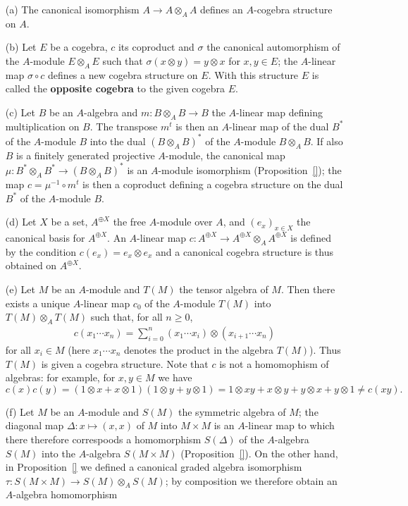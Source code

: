 \begin{example}
\mbox{}
\begin{itemize}
\item[(a)] The canonical isomorphism $A\to A\otimes_AA$ defines an $A$-cogebra structure on $A$.
\item[(b)] Let $E$ be a cogebra, $c$ its coproduct and $\sigma$ the canonical automorphism of the $A$-module $E\otimes_AE$ such that $\sigma(x\otimes y)=y\otimes x$ for $x,y\in E$; the $A$-linear map $\sigma\circ c$ defines a new cogebra structure on $E$. With this structure $E$ is called the \textbf{opposite cogebra} to the given cogebra $E$.
\item[(c)] Let $B$ be an $A$-algebra and $m:B\otimes_AB\to B$ the $A$-linear map defining multiplication on $B$. The transpose $m^t$ is then an $A$-linear map of the dual $B^*$ of the $A$-module $B$ into the dual $(B\otimes_AB)^*$ of the $A$-module $B\otimes_AB$. If also $B$ is a finitely generated projective $A$-module, the canonical map $\mu:B^*\otimes_AB^*\to(B\otimes_AB)^*$ is an $A$-module isomorphism (Proposition~\ref{}); the map $c=\mu^{-1}\circ m^t$ is then a coproduct defining a cogebra structure on the dual $B^*$ of the $A$-module $B$.
\item[(d)] Let $X$ be a set, $A^{\oplus X}$ the free $A$-module over $A$, and $(e_x)_{x\in X}$ the canonical basis for $A^{\oplus X}$. An $A$-linear map $c:A^{\oplus X}\to A^{\oplus X}\otimes_A A^{\oplus X}$ is defined by the condition $c(e_x)=e_x\otimes e_x$ and a canonical cogebra structure is thus obtained on $A^{\oplus X}$.
\item[(e)] Let $M$ be an $A$-module and $T(M)$ the tensor algebra of $M$. Then there exists a unique $A$-linear map $c_0$ of the $A$-module $T(M)$ into $T(M)\otimes_AT(M)$ such that, for all $n\geq 0$,
\begin{align}\label{tensor algebra weak coproduct}
c(x_1\cdots x_n)=\sum_{i=0}^{n}(x_1\cdots x_i)\otimes(x_{i+1}\cdots x_n)
\end{align}
for all $x_i\in M$ (here $x_1\cdots x_n$ denotes the product in the algebra $T(M)$). Thus $T(M)$ is given a cogebra structure. Note that $c$ is not a homomophism of algebras: for example, for $x,y\in M$ we have
\[c(x)c(y)=(1\otimes x+x\otimes 1)(1\otimes y+y\otimes 1)=1\otimes xy+x\otimes y+y\otimes x+y\otimes 1\neq c(xy).\]
\item[(f)] Let $M$ be an $A$-module and $S(M)$ the symmetric algebra of $M$; the diagonal map $\Delta:x\mapsto(x,x)$ of $M$ into $M\times M$ is an $A$-linear map to which there therefore correspoods a homomorphism $S(\Delta)$ of the $A$-algebra $S(M)$ into the $A$-algebra $S(M\times M)$ (Proposition~\ref{}). On the other hand, in Proposition~\ref{} we defined a canonical graded algebra isomorphism $\tau:S(M\times M)\to S(M)\otimes_AS(M)$; by composition we therefore obtain an $A$-algebra homomorphism

\end{itemize}
\end{example}
